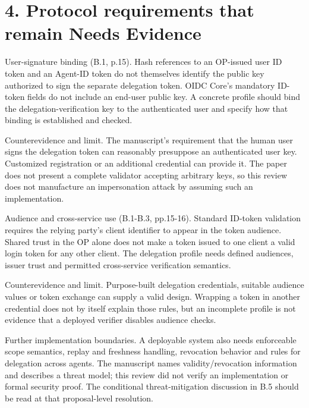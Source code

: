 \documentclass[10pt]{article}
\begin{document}
\section*{4. Protocol requirements that remain Needs Evidence}
User-signature binding (B.1, p.15). Hash references to an OP-issued user ID token and an Agent-ID token do not themselves identify the public key authorized to sign the separate delegation token. OIDC Core’s mandatory ID-token fields do not include an end-user public key. A concrete profile should bind the delegation-verification key to the authenticated user and specify how that binding is established and checked.\par
Counterevidence and limit. The manuscript’s requirement that the human user signs the delegation token can reasonably presuppose an authenticated user key. Customized registration or an additional credential can provide it. The paper does not present a complete validator accepting arbitrary keys, so this review does not manufacture an impersonation attack by assuming such an implementation.\par
Audience and cross-service use (B.1-B.3, pp.15-16). Standard ID-token validation requires the relying party’s client identifier to appear in the token audience. Shared trust in the OP alone does not make a token issued to one client a valid login token for any other client. The delegation profile needs defined audiences, issuer trust and permitted cross-service verification semantics.\par
Counterevidence and limit. Purpose-built delegation credentials, suitable audience values or token exchange can supply a valid design. Wrapping a token in another credential does not by itself explain those rules, but an incomplete profile is not evidence that a deployed verifier disables audience checks.\par
Further implementation boundaries. A deployable system also needs enforceable scope semantics, replay and freshness handling, revocation behavior and rules for delegation across agents. The manuscript names validity/revocation information and describes a threat model; this review did not verify an implementation or formal security proof. The conditional threat-mitigation discussion in B.5 should be read at that proposal-level resolution.\par
\end{document}
